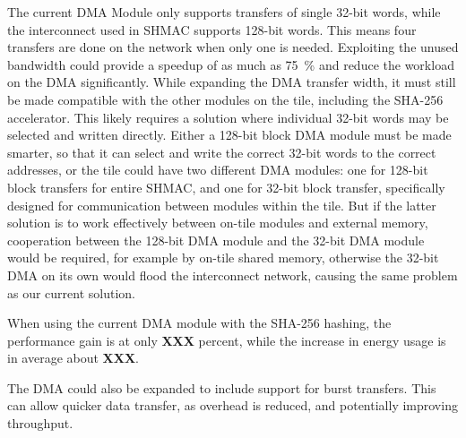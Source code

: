 The current DMA Module only supports transfers of single 32-bit words, while the interconnect used in SHMAC supports 128-bit words.
This means four transfers are done on the network when only one is needed. Exploiting the unused bandwidth could
provide a speedup of as much as 75~\% and reduce the workload on the DMA significantly.
While expanding the DMA transfer width, it must still be made compatible with the other modules on the tile, including the SHA-256 accelerator.
This likely requires a solution where individual 32-bit words may be selected and written directly.
Either a 128-bit block DMA module must be made smarter, so that it can select and write the correct 32-bit words to the correct addresses, or the tile could have two different DMA modules: one for 128-bit block transfers for entire SHMAC, and one for 32-bit block transfer, specifically designed for communication between modules within the tile.
But if the latter solution is to work effectively between on-tile modules and external memory, cooperation between the 128-bit DMA module and the 32-bit DMA module would be required, for example by on-tile shared memory, otherwise the 32-bit DMA on its own would flood the interconnect network, causing the same problem as  our current solution.


When using the current DMA module with the SHA-256 hashing, the performance gain is at only \textbf{XXX} percent, while the increase in energy usage is in average about  \textbf{XXX}.

The DMA could also be expanded to include support for burst transfers. This can allow quicker data
transfer, as overhead is reduced, and potentially improving throughput.


